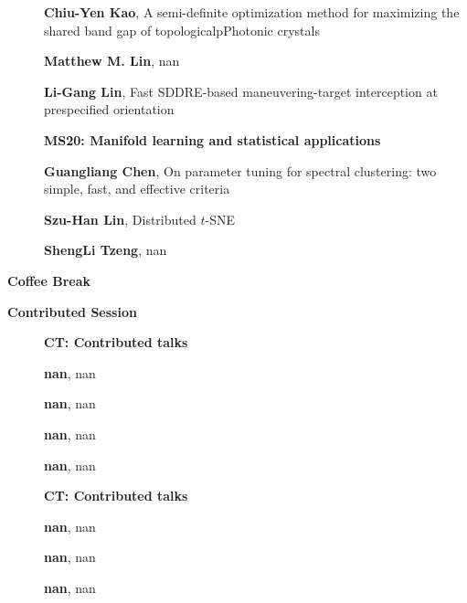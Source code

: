 \documentclass[ILAS2025-program.tex]{subfiles}
\begin{document}
\begin{description}
\begin{description}
    \item[] \textbf{Chiu-Yen Kao}, A semi-definite optimization method for maximizing the shared band gap of topologicalpPhotonic crystals
        \item[] \textbf{Matthew M. Lin}, nan
        \item[] \textbf{Li-Gang Lin}, Fast SDDRE-based maneuvering-target interception at prespecified orientation
        \end{description}
    \begin{description}
    \item[] {\color{mstitle}\textbf{MS20: Manifold learning and statistical applications}} 
    \item[] \textbf{Guangliang Chen}, On parameter tuning for spectral clustering: two simple, fast, and effective criteria
        \item[] \textbf{Szu-Han Lin}, Distributed $t$-SNE
        \item[] \textbf{ShengLi Tzeng}, nan
        \end{description}
    \item[\info{15:30\textrm{--}16:00}] \textbf{Coffee Break} 
    \item[\info{16:00\textrm{--}18:00}] \textbf{Contributed Session} 
    \begin{description}
    \item[] {\color{mstitle}\textbf{CT: Contributed talks}} 
    \item[] \textbf{nan}, nan
        \item[] \textbf{nan}, nan
        \item[] \textbf{nan}, nan
        \item[] \textbf{nan}, nan
        \end{description}
    \begin{description}
    \item[] {\color{mstitle}\textbf{CT: Contributed talks}} 
    \item[] \textbf{nan}, nan
        \item[] \textbf{nan}, nan
        \item[] \textbf{nan}, nan

\end{description}
\end{description}
\end{document}

